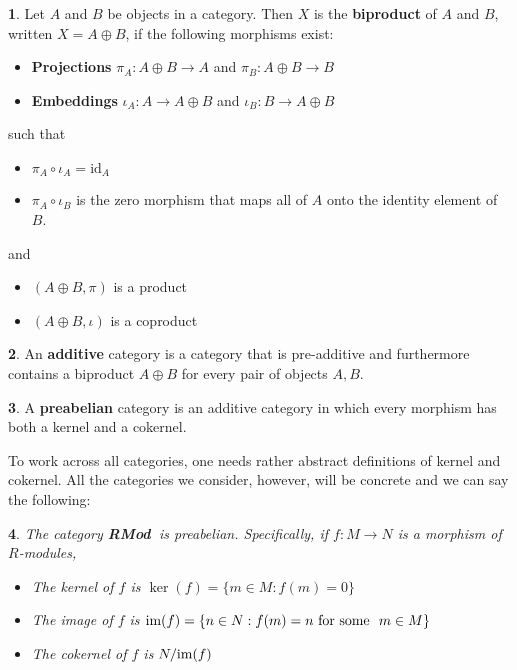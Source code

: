 \documentclass[oneside,english]{amsbook}
\numberwithin{section}{chapter}
\theoremstyle{plain}
\newtheorem{thm}{\protect\theoremname}
\theoremstyle{definition}
\newtheorem{defn}[thm]{\protect\definitionname}
\providecommand{\definitionname}{Definition}
\providecommand{\theoremname}{Theorem}
\newcommand{\catname}[1]{{\normalfont\textbf{#1}}}
\newcommand{\RMod}{\catname{RMod\ }}
\newcommand{\im}{\text{\upshape{im}}}
\begin{document}
			\begin{defn}
				Let $A$ and $B$ be objects in a category. Then $X$ is the \textbf{biproduct} of $A$ and $B$, written $X = A\oplus B$, if the following morphisms exist:
				\begin{itemize}
					\item \textbf{Projections} $\pi_A: A\oplus B\to A$ and $\pi_B: A\oplus B\to B$ 
					\item \textbf{Embeddings} $\iota_A: A\to A\oplus B$ and $\iota_B: B\to A\oplus B$ 
				\end{itemize}
				such that
				\begin{itemize}
					\item $\pi_A\circ\iota_A = \text{id}_A$
					\item $\pi_A\circ\iota_B$ is the zero morphism that maps all of $A$ onto the identity element of $B$.
				\end{itemize}
				and
				\begin{itemize}
					\item $(A\oplus B, \pi)$ is a product
					\item $(A\oplus B, \iota)$ is a coproduct
				\end{itemize}
			\end{defn}
			
			\begin{defn}
				An \textbf{additive} category is a category that is pre-additive and furthermore contains a biproduct $A\oplus B$ for every pair of objects $A, B$.
			\end{defn}
			
			\begin{defn}
				A \textbf{preabelian} category is an additive category in which every morphism has both a kernel and a cokernel.
			\end{defn}
			
			To work across all categories, one needs rather abstract definitions of kernel and cokernel. All the categories we consider, however, will be concrete and we can say the following:
			
			\begin{thm}
				The category \RMod is preabelian. Specifically, if $f:M\to N$ is a morphism of $R$-modules,
				\begin{itemize}
					\item The kernel of $f$ is $\ker(f) = \{m\in M : f(m) = 0\}$
					\item The image of $f$ is $\im(f) = \{n\in N : f(m) = n\ \text{for some }\ m\in M\}$
					\item The cokernel of $f$ is $N/\im(f)$
				\end{itemize}
			\end{thm}
			
\end{document}

